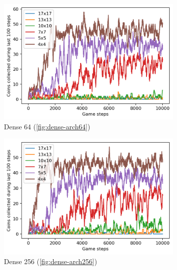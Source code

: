 
\begin{figure}
  \centering
  \begin{subfigure}[b]{0.48\linewidth}
    \centering
    	\includegraphics[width=\linewidth]{images/minigame-dense64-arch.png}
    \caption{Dense 64 (\ref{fig:dense-arch64})}
    \label{fig:network-dense64}
  \end{subfigure}
  \quad
  \begin{subfigure}[b]{0.48\linewidth}
    \centering
      \includegraphics[width=\linewidth]{images/minigame-dense256-arch.png}
    \caption{Dense 256 (\ref{fig:dense-arch256})}
    \label{fig:network-dense256}
  \end{subfigure}
  \begin{subfigure}[b]{0.48\linewidth}
    \centering

\end{subfigure}
\end{figure}
